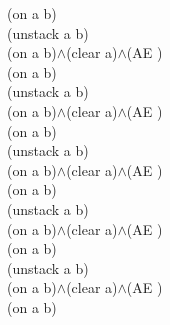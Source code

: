 {{(on a b)\\
(unstack a b)\\
(on a b)$\wedge$(clear a)$\wedge$(AE )\\
(on a b)\\
(unstack a b)\\
(on a b)$\wedge$(clear a)$\wedge$(AE )\\
(on a b)\\
(unstack a b)\\
(on a b)$\wedge$(clear a)$\wedge$(AE )\\
(on a b)\\
(unstack a b)\\
(on a b)$\wedge$(clear a)$\wedge$(AE )\\
(on a b)\\
(unstack a b)\\
(on a b)$\wedge$(clear a)$\wedge$(AE )\\
(on a b)\\
}%
}

